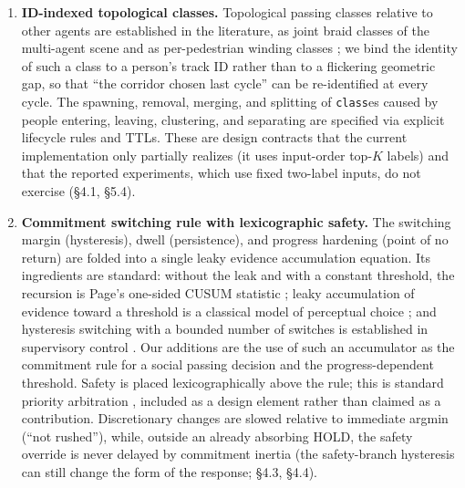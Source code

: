 \documentclass[11pt]{article}
\newcommand{\Class}{\texttt{class}}
\begin{document}
\begin{enumerate}
\item \textbf{ID-indexed topological classes.} Topological passing classes relative to other agents are established in the literature, as joint braid classes of the multi-agent scene \cite{mavrogiannis2019braids} and as per-pedestrian winding classes \cite{mavrogiannis2023winding}; we bind the identity of such a class to a person's track ID rather than to a flickering geometric gap, so that ``the corridor chosen last cycle'' can be re-identified at every cycle. The spawning, removal, merging, and splitting of \Class{es} caused by people entering, leaving, clustering, and separating are specified via explicit lifecycle rules and TTLs. These are design contracts that the current implementation only partially realizes (it uses input-order top-$K$ labels) and that the reported experiments, which use fixed two-label inputs, do not exercise (\S4.1, \S5.4).
\item \textbf{Commitment switching rule with lexicographic safety.} The switching margin (hysteresis), dwell (persistence), and progress hardening (point of no return) are folded into a single leaky evidence accumulation equation. Its ingredients are standard: without the leak and with a constant threshold, the recursion is Page's one-sided CUSUM statistic \cite{page1954cusum}; leaky accumulation of evidence toward a threshold is a classical model of perceptual choice \cite{usher2001lca}; and hysteresis switching with a bounded number of switches is established in supervisory control \cite{hespanha2003hysteresis}. Our additions are the use of such an accumulator as the commitment rule for a social passing decision and the progress-dependent threshold. Safety is placed lexicographically above the rule; this is standard priority arbitration \cite{orzechowski2020arbitration, spieker2024arbitration}, included as a design element rather than claimed as a contribution. Discretionary changes are slowed relative to immediate argmin (``not rushed''), while, outside an already absorbing HOLD, the safety override is never delayed by commitment inertia (the safety-branch hysteresis can still change the form of the response; \S4.3, \S4.4).

\end{enumerate}
\end{document}
